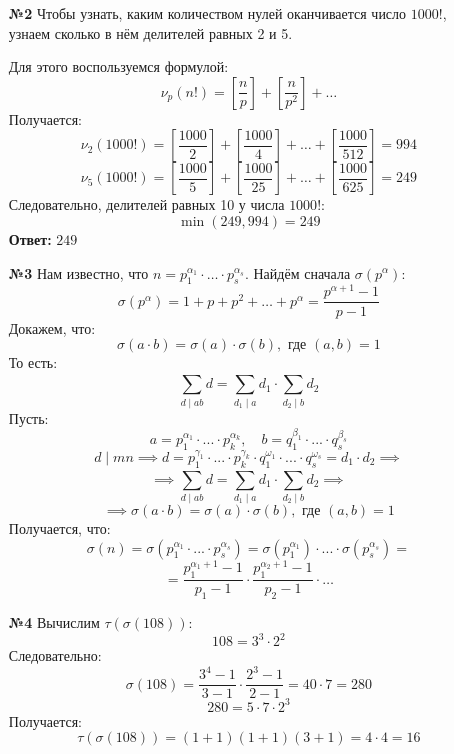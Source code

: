 \documentclass[a4paper]{article}
\renewcommand{\f}[2]{\frac{#1}{#2}}
\newcommand{\s}[2]{\sum\limits_{#1}^{#2}}
\newcommand{\divides}{\;|\;}
\begin{document}
\begin{enumerate}
    \item[\textbf{№2}]Чтобы узнать, каким количеством нулей оканчивается число $1000!$, узнаем сколько в нём делителей равных 2 и 5. 
    
    Для этого воспользуемся формулой:
    $$\nu_{p}(n!) = \left[\f{n}{p}\right]+\left[\f{n}{p^2}\right]+ \dots $$
    Получается:
    $$\nu_{2}(1000!) = \left[\f{1000}{2}\right]+\left[\f{1000}{4}\right]+ \dots + \left[\f{1000}{512}\right] = 994$$
    $$\nu_{5}(1000!) = \left[\f{1000}{5}\right]+\left[\f{1000}{25}\right]+ \dots + \left[\f{1000}{625}\right] = 249$$
    Следовательно, делителей равных 10 у числа $1000!$:
    $$\min(249, 994) = 249$$
    \textbf{Ответ: } $249$

    \item[\textbf{№3}]Нам известно, что $n = p_1^{\alpha_1}\cdot \dots \cdot p_s^{\alpha_s}$. Найдём сначала $\sigma(p^\alpha)$:
    $$\sigma(p^\alpha) = 1 + p + p^2 + \dots + p^{\alpha} = \f{p^{\alpha+1}-1}{p-1}$$
    Докажем, что:
    $$
    \sigma(a \cdot b) = \sigma(a) \cdot \sigma(b), \text{ где $(a, b) = 1$}
    $$
    То есть:
    $$\s{d \divides ab}{}d =\s{d_1 \divides a}{}d_1 \cdot \s{d_2 \divides b}{}d_2 $$
    Пусть:
    $$a = p_1^{\alpha_1}\cdot...\cdot p_k^{\alpha_k},\quad b =q_1^{\beta_1}\cdot...\cdot q_s^{\beta_s}$$
    $$d \divides mn \implies d = p_1^{\gamma_1}\cdot...\cdot p_k^{\gamma_k} \cdot q_1^{\omega_1}\cdot...\cdot q_s^{\omega_s} = d_1 \cdot d_2 \implies$$
    $$\implies \s{d \divides ab}{}d =\s{d_1 \divides a}{}d_1 \cdot \s{d_2 \divides b}{}d_2 \implies$$
    $$\implies \sigma(a \cdot b) = \sigma(a) \cdot \sigma(b), \text{ где $(a, b) = 1$}$$
    Получается, что:
    $$\sigma(n) = \sigma(p_1^{\alpha_1}\cdot ... \cdot p_s^{\alpha_s}) = \sigma(p_1^{\alpha_1}) \cdot...\cdot \sigma(p_s^{\alpha_s}) =$$
    $$= \f{p_1^{\alpha_1+1}-1}{p_1-1}\cdot \f{p_1^{\alpha_2+1}-1}{p_2-1} \cdot \dots$$

    \item[\textbf{№4}]Вычислим $\tau(\sigma(108))$:
    $$108 = 3^3\cdot2^2$$
    Следовательно:
    $$\sigma(108) = \f{3^4-1}{3-1}\cdot \f{2^3-1}{2-1} = 40\cdot 7 = 280$$
    $$280 = 5\cdot7\cdot2^3$$
    Получается:
    $$\tau(\sigma(108)) = (1+1)(1+1)(3+1) = 4\cdot4 = 16$$


\end{enumerate}
\end{document}
